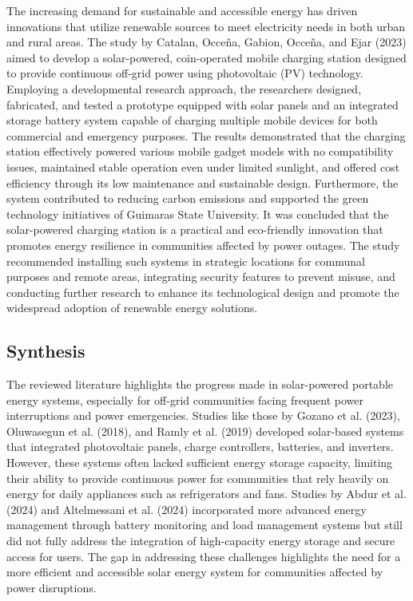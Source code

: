 {The increasing demand for sustainable and accessible energy has driven innovations that utilize renewable sources to meet electricity needs in both urban and rural areas. The study by Catalan, Occeña, Gabion, Occeña, and Ejar (2023) aimed to develop a solar-powered, coin-operated mobile charging station designed to provide continuous off-grid power using photovoltaic (PV) technology. Employing a developmental research approach, the researchers designed, fabricated, and tested a prototype equipped with solar panels and an integrated storage battery system capable of charging multiple mobile devices for both commercial and emergency purposes. The results demonstrated that the charging station effectively powered various mobile gadget models with no compatibility issues, maintained stable operation even under limited sunlight, and offered cost efficiency through its low maintenance and sustainable design. Furthermore, the system contributed to reducing carbon emissions and supported the green technology initiatives of Guimaras State University. It was concluded that the solar-powered charging station is a practical and eco-friendly innovation that promotes energy resilience in communities affected by power outages. The study recommended installing such systems in strategic locations for communal purposes and remote areas, integrating security features to prevent misuse, and conducting further research to enhance its technological design and promote the widespread adoption of renewable energy solutions.

\subsection{Synthesis}

The reviewed literature highlights the progress made in solar-powered portable energy systems, especially for off-grid communities facing frequent power interruptions and power emergencies. Studies like those by Gozano et al. (2023), Oluwasegun et al. (2018), and Ramly et al. (2019) developed solar-based systems that integrated photovoltaic panels, charge controllers, batteries, and inverters. However, these systems often lacked sufficient energy storage capacity, limiting their ability to provide continuous power for communities that rely heavily on energy for daily appliances such as refrigerators and fans. Studies by Abdur et al. (2024) and Altelmessani et al. (2024) incorporated more advanced energy management through battery monitoring and load management systems but still did not fully address the integration of high-capacity energy storage and secure access for users. The gap in addressing these challenges highlights the need for a more efficient and accessible solar energy system for communities affected by power disruptions.

}
